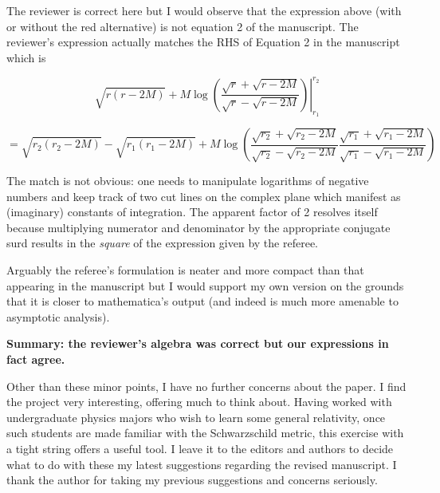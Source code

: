 \documentclass[12pt]{article}
\begin{document}
{\color{blue} The reviewer is correct here but I would observe that
  the expression above (with or without the red alternative) is not
  equation 2 of the manuscript.  The reviewer's expression actually
  matches the RHS of Equation 2 in the manuscript which is

  \[
  \left.
  \sqrt{r(r-2M)} +M\log\left(
  \frac{\sqrt{r}+\sqrt{r-2M}}{\sqrt{r}-\sqrt{r-2M}}\right)
  \right|_{r_1}^{r_2}
  \]

  \[
  = 
  \sqrt{r_2(r_2-2M)}-  \sqrt{r_1(r_1-2M)}
 +M\log\left(
 \frac{\sqrt{r_2}+\sqrt{r_2-2M}}{\sqrt{r_2}-\sqrt{r_2-2M}}
 \frac{\sqrt{r_1}+\sqrt{r_1-2M}}{\sqrt{r_1}-\sqrt{r_1-2M}}
 \right)
  \]

The match is not obvious: one needs to manipulate logarithms of
negative numbers and keep track of two cut lines on the complex plane
which manifest as (imaginary) constants of integration.  The apparent
factor of 2 resolves itself because multiplying numerator and
denominator by the appropriate conjugate surd results in the {\em
  square} of the expression given by the referee.

Arguably the referee's formulation is neater and more compact than
that appearing in the manuscript but I would support my own version on
the grounds that it is closer to mathematica's output (and indeed is
much more amenable to asymptotic analysis).

{\bf Summary: the reviewer's algebra was correct but our expressions
  in fact agree.}
}

Other than these minor points, I have no further concerns about the
paper. I find the project very interesting, offering much to think
about. Having worked with undergraduate physics majors who wish to
learn some general relativity, once such students are made familiar
with the Schwarzschild metric, this exercise with a tight string
offers a useful tool. I leave it to the editors and authors to decide
what to do with these my latest suggestions regarding the revised
manuscript. I thank the author for taking my previous suggestions and
concerns seriously.
\end{document}
